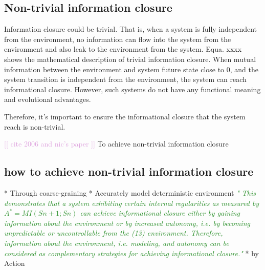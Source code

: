 \documentclass[utf8]{article}
\newcommand{\rewrite}[1]{\textcolor{ForestGreen}{\textit{"#1"}}}
\newcommand{\temp}[1]{\textcolor{Plum}{[[ #1 ]]\newline}}
\begin{document}
		
		
		
		
		\subsection{Non-trivial information closure}
			Information closure could be trivial. That is, when a system is fully independent from the environment, no information can flow into the system from the environment and also leak to the environment from the system. Equa. xxxx shows the mathematical description of trivial information closure. When mutual information between the environment and system future state close to 0, and the system transition is independent from the environment, the system can reach informational closure. However, such systems do not have any functional meaning and evolutional advantages.
			
			Therefore, it's important to ensure the informational closure that the system reach is non-trivial.
		
			\temp{cite 2006 and nic's paper}
			To achieve non-trivial information closure
			\citep{BERTSCHINGER.2006}\\
			\citep{guttenberg2016neural}
		
		
		
		
		\subsection{how to achieve non-trivial information closure}
			* Through coarse-graining
			* Accurately model deterministic environment 
				\rewrite{
					This demonstrates that a system exhibiting certain internal regularities as measured by $A^* = MI(Sn+1; Sn)$ can achieve informational closure either by gaining information about the environment or by increased autonomy, i.e. by becoming unpredictable or uncontrollable from the (13) environment. Therefore, information about the environment, i.e. modeling, and autonomy can be considered as complementary strategies for achieving informational closure.}
			* by Action 
		
\end{document}
